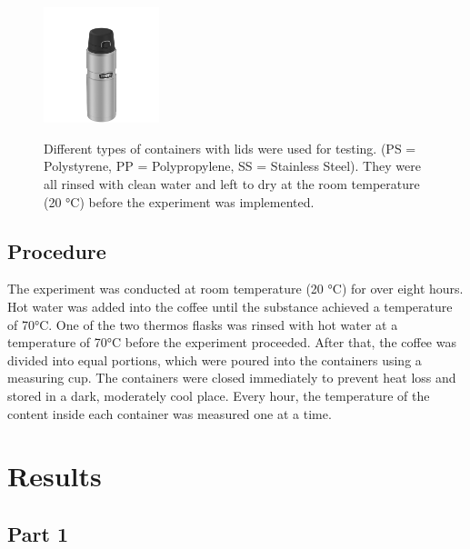 \documentclass[11pt]{article}
\begin{document}
\begin{figure}[H]
	{\includegraphics[width=0.3\textwidth,height=0.2\textheight]{Thermos}}
	\caption{Different types of containers with lids were used for testing. (PS = Polystyrene, PP = Polypropylene, SS = Stainless Steel). They were all rinsed with clean water and left to dry at the room temperature (20 °C) before the experiment was implemented. }
	\label{Figure 3}
\end{figure}

\pagebreak

\subsection*{Procedure}

The experiment was conducted at room temperature (20 °C) for over eight hours. Hot water was added into the coffee until the substance achieved a temperature of 70°C. One of the two thermos flasks was rinsed with hot water at a temperature of 70°C before the experiment proceeded. After that, the coffee was divided into equal portions, which were poured into the containers using a measuring cup. The containers were closed immediately to prevent heat loss and stored in a dark, moderately cool place. Every hour, the temperature of the content inside each container was measured one at a time. 
\section*{Results}

\subsection*{Part 1}
\end{document}
